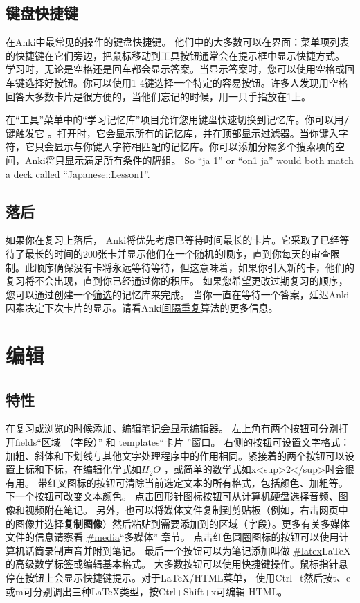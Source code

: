 \documentclass[a4paper]{book}
\begin{document}
	\section{键盘快捷键}
	
	在Anki中最常见的操作的键盘快捷键。 他们中的大多数可以在界面：菜单项列表的快捷键在它们旁边，把鼠标移动到工具按钮通常会在提示框中显示快捷方式。
	学习时，无论是空格还是回车都会显示答案。当显示答案时，您可以使用空格或回车键选择好按钮。你可以使用1-4键选择一个特定的容易按钮。许多人发现用空格回答大多数卡片是很方便的，当他们忘记的时候，用一只手指放在1上。
	
	在“工具”菜单中的“学习记忆库”项目允许您用键盘快速切换到记忆库。你可以用\textbf{/}键触发它 。打开时，它会显示所有的记忆库，并在顶部显示过滤器。当你键入字符，它只会显示与你键入字符相匹配的记忆库。你可以添加分隔多个搜索项的空间，Anki将只显示满足所有条件的牌组。 So “ja 1” or “on1 ja” would both match a deck called
	“Japanese::Lesson1”.
	
	\section{落后}
	
	如果你在复习上落后， Anki将优先考虑已等待时间最长的卡片。它采取了已经等待了最长的时间的200张卡并显示他们在一个随机的顺序，直到你每天的审查限制。此顺序确保没有卡将永远等待等待，但这意味着，如果你引入新的卡，他们的复习将不会出现，直到你已经通过你的积压。
	如果您希望更改过期复习的顺序，您可以通过创建一个\hyperref[filtered]{筛选}的记忆库来完成。
	当你一直在等待一个答案，延迟Anki因素决定下次卡片的显示。请看Anki\hyperref[whatalgorithm]{间隔重复}算法的更多信息。
	
	
	\chapter{编辑}\label{editor}
	
	\section{特性}
	在复习或\hyperref[browser]{浏览}的时候\hyperref[addingnotes]{添加}、\hyperref[editmore]{编辑}笔记会显示编辑器。
	左上角有两个按钮可分别打开\url{fields}“区域
	（字段）” 和
	\url{templates}“卡片
	”窗口。
	右侧的按钮可设置文字格式：加粗、斜体和下划线与其他文字处理程序中的作用相同。紧接着的两个按钮可以设置上标和下标，在编辑化学式如$H_2O$ ，或简单的数学式如x<sup>2</sup>时会很有用。
	带红叉图标的按钮可清除当前选定文本的所有格式，包括颜色、加粗等。
	下一个按钮可改变文本颜色。
	点击回形针图标按钮可从计算机硬盘选择音频、图像和视频附在笔记。 另外，也可以将媒体文件复制到剪贴板（例如，右击网页中的图像并选择\textbf{复制图像}）然后粘贴到需要添加到的区域（字段）。更多有关多媒体文件的信息请察看
	\url{#media}“多媒体” 章节。
	点击红色圆圈图标的按钮可以使用计算机话筒录制声音并附到笔记。
	最后一个按钮可以为笔记添加叫做
	\url{#latex}\LaTeX{}的高级数学标签或编辑基本格式。
	大多数按钮可以使用快捷键操作。鼠标指针悬停在按钮上会显示快捷键提示。对于\LaTeX{}/HTML菜单， 使用Ctrl+t然后按t、e或m可分别调出三种\LaTeX{}类型，按Ctrl+Shift+x可编辑 HTML。
\end{document}
